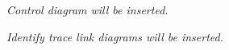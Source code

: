 \documentclass[conference]{IEEEtran}
\begin{document}
\textit{Control diagram will be inserted.}

\textit{Identify trace link diagrams will be inserted.}




\end{document}
